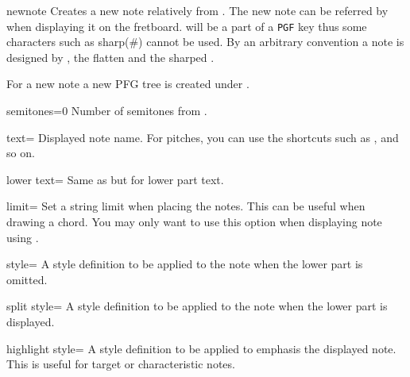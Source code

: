 \documentclass[a4paper]{article}
\newcommand{\pkg}[1]{\texttt{#1}}
\begin{document}
\begin{docCommand}{newnote}{}
  Creates a new note  relatively from \pC. The new note can be
  referred by  when displaying it on the fretboard. 
  will be a part of a \pkg{PGF} key thus some characters such as sharp(\#)
  cannot be used. By an arbitrary convention a note is designed by
  , the flatten  and the sharped
  .

  For a new note a new PFG tree is created under .

  \begin{docKey}{semitones}{=}{0}
    Number of semitones from \pC.
  \end{docKey}

  \begin{docKey}{text}{=}{}
    Displayed note name. For pitches, you can use the  shortcuts such
    as ,   and so on.
  \end{docKey}

  \begin{docKey}{lower text}{=}{}
    Same as  but for lower part text.
  \end{docKey}

  \begin{docKey}{limit}{=}{}
    Set a string limit when placing the notes. This can be useful when
    drawing a chord. You may only want to use this option when displaying
    note using .
  \end{docKey}

  \begin{docKey}{style}{=}{}
    A style definition to be applied to the note when the lower part is
    omitted.
  \end{docKey}

  \begin{docKey}{split style}{=}{}
    A style definition to be applied to the note when the lower part is
    displayed.
  \end{docKey}

  \begin{docKey}{highlight style}{=}{}
    A style definition to be applied to emphasis the displayed note. This is
    useful for target or characteristic notes.
  \end{docKey}


\end{docCommand}
\end{document}
